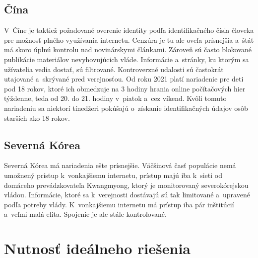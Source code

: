 \documentclass{artikel1}
\begin{document}
\subsection{Čína}

V~Číne  je taktiež požadované overenie identity podľa identifikačného čísla človeka pre možnosť plného využívania internetu. Cenzúra  je tu ale oveľa prísnejšia a~štát má skoro úplnú kontrolu nad novinárskymi článkami. Zároveň sú často blokované publikácie materiálov nevyhovujúcich vláde. Informácie a~stránky, ku ktorým sa užívatelia vedia dostať, sú filtrované. Kontroverzné udalosti sú častokrát utajované a~skrývané pred verejnosťou. Od roku 2021 platí nariadenie pre deti pod 18 rokov, ktoré ich obmedzuje na 3 hodiny hrania online počítačových hier týždenne, teda od 20. do 21. hodiny v~piatok a~cez víkend. Kvôli tomuto nariadeniu sa niektorí tínedžeri pokúšajú o~získanie identifikačných údajov osôb starších ako 18 rokov.~\cite{wiki-china, china-game-limit}

\subsection{Severná Kórea}

Severná Kórea  má nariadenia ešte prísnejšie. Väčšinová časť populácie nemá umožnený prístup k~vonkajšiemu internetu, prístup majú iba k~sieti od domáceho prevádzkovateľa Kwangmyong, ktorý je monitorovaný severokórejskou vládou. Informácie, ktoré sa k~verejnosti dostávajú sú tak limitované a~upravené podľa potreby vlády.  K~vonkajšiemu internetu  má prístup iba pár inštitúcií a~veľmi malá elita. Spojenie je ale stále kontrolované.~\cite{wiki-nk-i, wiki-nk-c}

\section{Nutnosť ideálneho riešenia}
\end{document}
